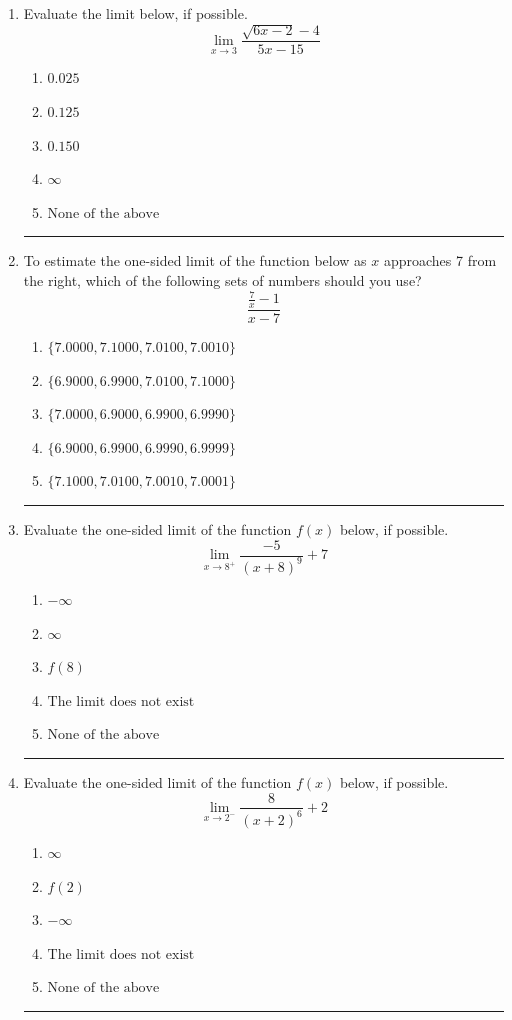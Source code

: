 \documentclass[14pt]{extbook}
\newcommand{\litem}[1]{\item#1\hspace*{-1cm}\rule{\textwidth}{0.4pt}}
\begin{document}
\begin{enumerate}
\litem{
Evaluate the limit below, if possible.\[ \lim_{x \rightarrow 3} \frac{\sqrt{6x - 2} - 4}{5x - 15} \]\begin{enumerate}[label=\Alph*.]
\item \( 0.025 \)
\item \( 0.125 \)
\item \( 0.150 \)
\item \( \infty \)
\item \( \text{None of the above} \)

\end{enumerate} }
\litem{
To estimate the one-sided limit of the function below as $x$ approaches 7 from the right, which of the following sets of numbers should you use?\[ \frac{\frac{7}{x} - 1}{x - 7} \]\begin{enumerate}[label=\Alph*.]
\item \( \{ 7.0000, 7.1000, 7.0100, 7.0010 \} \)
\item \( \{ 6.9000, 6.9900, 7.0100, 7.1000 \} \)
\item \( \{ 7.0000, 6.9000, 6.9900, 6.9990 \} \)
\item \( \{ 6.9000, 6.9900, 6.9990, 6.9999 \} \)
\item \( \{ 7.1000, 7.0100, 7.0010, 7.0001 \} \)

\end{enumerate} }
\litem{
Evaluate the one-sided limit of the function $f(x)$ below, if possible.\[ \lim_{x \rightarrow 8^+} \frac{-5}{(x+8)^9}+7 \]\begin{enumerate}[label=\Alph*.]
\item \( -\infty \)
\item \( \infty \)
\item \( f(8) \)
\item \( \text{The limit does not exist} \)
\item \( \text{None of the above} \)

\end{enumerate} }
\litem{
Evaluate the one-sided limit of the function $f(x)$ below, if possible.\[ \lim_{x \rightarrow 2^-} \frac{8}{(x+2)^6}+2 \]\begin{enumerate}[label=\Alph*.]
\item \( \infty \)
\item \( f(2) \)
\item \( -\infty \)
\item \( \text{The limit does not exist} \)
\item \( \text{None of the above} \)


\end{enumerate}}
\end{enumerate}
\end{document}
